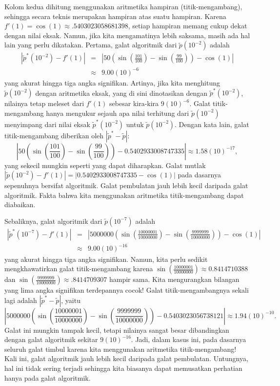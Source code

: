 \noindent Kolom kedua dihitung menggunakan aritmetika hampiran (titik-mengambang),
sehingga secara teknis merupakan hampiran atas suatu hampiran. Karena
$f'(1)=\cos(1)\approx.5403023058681398$, setiap hampiran memang cukup
dekat dengan nilai eksak. Namun, jika kita mengamatinya lebih saksama,
masih ada hal lain yang perlu dikatakan. Pertama, galat algoritmik
dari $\tilde{p}(10^{-2})$ adalah 
\begin{eqnarray*}
|\tilde{p}^{*}(10^{-2})-f'(1)| & = & \left|50\left(\sin\left(\frac{101}{100}\right)-\sin\left(\frac{99}{100}\right)\right)-\cos(1)\right|\\
 & \approx & 9.00(10)^{-6}
\end{eqnarray*}
yang akurat hingga tiga angka signifikan. Artinya, jika kita menghitung
$\tilde{p}(10^{-2})$ dengan aritmetika eksak, yang di sini dinotasikan
dengan $\tilde{p}^{*}(10^{-2})$, nilainya tetap meleset dari $f'(1)$
sebesar kira-kira $9(10)^{-6}$. Galat titik-mengambang
hanya mengukur sejauh apa nilai terhitung dari $\tilde{p}(10^{-2})$
menyimpang dari nilai eksak $\tilde{p}^{*}(10^{-2})$ untuk $\tilde{p}(10^{-2})$.
Dengan kata lain, galat titik-mengambang diberikan oleh $\left|\tilde{p}^{*}-\tilde{p}\right|$:
\[
\left|50\left(\sin\left(\frac{101}{100}\right)-\sin\left(\frac{99}{100}\right)\right)-0.5402933008747335\right|\approx1.58(10)^{-17},
\]
yang sekecil mungkin seperti yang dapat diharapkan. Galat mutlak $|\tilde{p}(10^{-2})-f'(1)|=|0.5402933008747335-\cos(1)|$
pada dasarnya sepenuhnya bersifat algoritmik. Galat pembulatan jauh
lebih kecil daripada galat algoritmik. Fakta bahwa kita menggunakan
aritmetika titik-mengambang dapat diabaikan. 

Sebaliknya, galat algoritmik dari $\tilde{p}(10^{-7})$ adalah 
\begin{eqnarray*}
|\tilde{p}^{*}(10^{-7})-f'(1)| & = & \left|5000000\left(\sin\left(\frac{10000001}{10000000}\right)-\sin\left(\frac{9999999}{10000000}\right)\right)-\cos(1)\right|\\
 & \approx & 9.00(10)^{-16}
\end{eqnarray*}
yang akurat hingga tiga angka signifikan. Namun, kita perlu sedikit
mengkhawatirkan galat titik-mengambang karena ${\displaystyle \sin\left(\frac{10000001}{10000000}\right)\approx0.8414710388}$
dan ${\displaystyle \sin\left(\frac{9999999}{10000000}\right)\approx.8414709307}$
hampir sama. Kita mengurangkan bilangan yang lima angka signifikan
terdepannya cocok! Galat titik-mengambangnya sekali lagi adalah $|\tilde{p}^{*}-\tilde{p}|$,
yaitu
\[
\left|5000000\left(\sin\left(\frac{10000001}{10000000}\right)-\sin\left(\frac{9999999}{10000000}\right)\right)-0.5403023056738121\right|\approx1.94(10)^{-10}.
\]
Galat ini mungkin tampak kecil, tetapi nilainya sangat besar dibandingkan
dengan galat algoritmik sekitar $9(10)^{-16}$. Jadi, dalam kasus
ini, pada dasarnya seluruh galat timbul karena kita menggunakan aritmetika
titik-mengambang! Kali ini, galat algoritmik jauh lebih kecil daripada
galat pembulatan. Untungnya, hal ini tidak sering terjadi sehingga
kita biasanya dapat memusatkan perhatian hanya pada galat algoritmik. 

